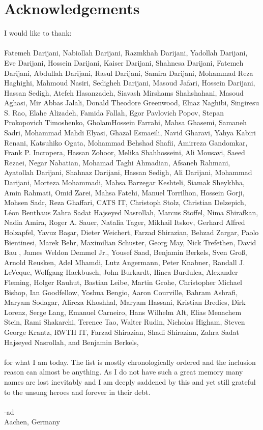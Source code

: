 \chapter*{Acknowledgements}


I would like to thank:\\\\
\noindent Fatemeh Darijani, Nabiollah Darijani, Razmkhah Darijani, Yadollah Darijani, Eve Darijani, Hossein Darijani, 
Kaiser Darijani, Shahnesa Darijani, Fatemeh Darijani, Abdullah Darijani, Rasul Darijani, Samira Darijani, 
Mohammad Reza Haghighi, Mahmoud Nasiri, Sedigheh Darijani, Masoud Jafari, Hossein Darijani, Hassan Sedigh, 
Atefeh Hasanzadeh, Siavash Mirshams Shahshahani, Masoud Aghasi, Mir Abbas Jalali, Donald Theodore Greenwood, Elnaz Naghibi, 
Singiresu S. Rao, Elahe Alizadeh, Famida Fallah, Egor Pavlovich Popov, Stepan Prokopovich Timoshenko, GholamHossein Farrahi, 
Mahsa Ghasemi, Samaneh Sadri, Mohammad Mahdi Elyasi, Ghazal Esmaeili, Navid Gharavi, Yahya Kabiri Renani, Katsuhiko Ogata, 
Mohammad Behshad Shafii, Amirreza Gandomkar, Frank P. Incropera, Hassan Zohoor, Melika Shahhosseini, Ali Mousavi, Saeed Rezaei, Negar Nabatian, 
Mohamad Taghi Ahmadian, Afsaneh Rahmani, Ayatollah Darijani, Shahnaz Darijani, Hassan Sedigh, Ali Darijani, 
Mohammad Darijani, Morteza Mohammadi, Mahsa Barzegar Keshteli, Siamak Sheykhha, Amin Rahmati, Omid Zarei, Mahsa Fatehi, 
Manuel Torrilhon, Hossein Gorji, Mohsen Sadr, Reza Ghaffari, CATS IT, Christoph Stolz, Christian Delzepich, Léon Benthaus  Zahra Sadat Hajseyed Nasrollah, Marcus Stoffel, 
Nima Shirafkan, Nadia Amira, Roger A. Sauer, Natalia Tager, Mikhail Itskov, Gerhard Alfred Holzapfel, Yavuz Başar, 
Dieter Weichert, Farzad Shirazian, Behzad Zargar, Paolo Bientinesi, Marek Behr, Maximilian Schuster, Georg May, 
Nick Trefethen, David Bau {\MakeUppercase{}}, James Weldon Demmel Jr., Yousef Saad, Benjamin Berkels, Sven Groß, 
Arnold Reusken, Adel Mhamdi, Lutz Angermann, Peter Knabner, Randall J. LeVeque, Wolfgang Hackbusch, John Burkardt, 
Ilinca Burdulea, Alexander Fleming, Holger Rauhut, Bastian Leibe, Martin Grohe, Christopher Michael Bishop, Ian Goodfellow, 
Yoshua Bengio, Aaron Courville, Bahram Ashrafi, Maryam Sodagar, Alireza Khoshhal, Maryam Hassani, Kristian Bredies, 
Dirk Lorenz, Serge Lang, Emanuel Carneiro, Hans Wilhelm Alt, Elias Menachem Stein, Rami Shakarchi, Terence Tao, Walter Rudin, Nicholas Higham, 
Steven George Krantz, RWTH IT, Farzad Shirazian, Shadi Shirazian, Zahra Sadat Hajseyed Nasrollah, 
and Benjamin Berkels,\\\\
for what I am today. The list is mostly chronologically ordered and the inclusion reason can almost be anything. 
As I do not have such a great memory many names are lost inevitably and I am deeply saddened by this and yet still 
grateful to the unsung heroes  and forever in their debt.
\\\\
-ad\\
Aachen, Germany\\

\endinput